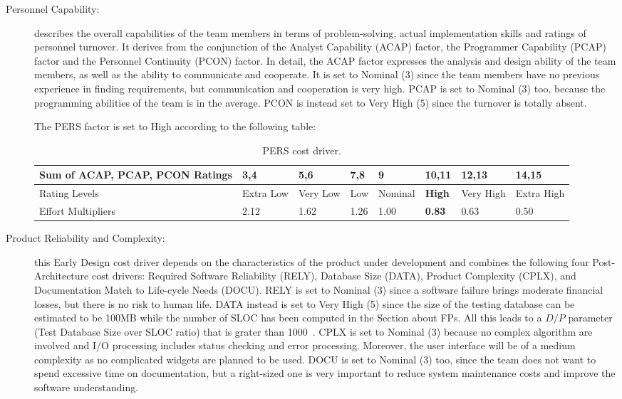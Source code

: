 \begin{description}
\item[Personnel Capability:] describes the overall capabilities of the team members in terms of problem-solving, actual implementation skills and ratings of personnel turnover. It derives from the conjunction of the Analyst Capability (ACAP) factor, the Programmer Capability (PCAP) factor and the Personnel Continuity (PCON) factor. In detail, the ACAP factor expresses the analysis and design ability of the team members, as well as the ability to communicate and cooperate. It is set to Nominal (3) since the team members have no previous experience in finding requirements, but communication and cooperation is very high. PCAP is set to Nominal (3) too, because the programming abilities of the team is in the average. PCON is instead set to Very High (5) since the turnover is totally absent.

The PERS factor is set to High according to the following table:

\begin{table}[H]
	\begin{adjustwidth}{-.5in}{-.5in}
    \centering
    \begin{tabular}{p{4cm}|p{1cm}|p{1cm}|p{1cm}|p{1.5cm}|p{1cm}|p{1cm}|p{1cm}}
        \hline
        Sum of ACAP, PCAP, PCON Ratings & 3,4 & 5,6 & 7,8 & 9 & \textbf{10,11} & 12,13 & 14,15 \\
        \hline
        \hline
        Rating Levels & Extra Low & Very Low & Low & Nominal & \textbf{High} & Very High & Extra High \\
        \hline
        Effort Multipliers & 2.12 & 1.62 & 1.26 & 1.00 & \textbf{0.83} & 0.63 & 0.50 \\
        \hline
    \end{tabular}
    \caption{PERS cost driver.}
    \end{adjustwidth}
\end{table}

\item[Product Reliability and Complexity:] this Early Design cost driver depends on the characteristics of the product under development and combines the following four Post-Architecture cost drivers: Required Software Reliability (RELY), Database Size (DATA), Product Complexity (CPLX), and Documentation Match to Life-cycle Needs (DOCU). RELY is set to Nominal (3) since a software failure brings moderate financial losses, but there is no risk to human life. DATA instead is set to Very High (5) since the size of the testing database can be estimated to be 100MB while the number of SLOC has been computed in the Section about FPs. All this leads to a $D/P$ parameter (Test Database Size over SLOC ratio) that is grater than 1000~\cite{cocomo-guide}. CPLX is set to Nominal (3) because no complex algorithm are involved and I/O processing includes status checking and error processing. Moreover, the user interface will be of a medium complexity as no complicated widgets are planned to be used. DOCU is set to Nominal (3) too, since the team does not want to spend excessive time on documentation, but a right-sized one is very important to reduce system maintenance costs and improve the software understanding.


\end{description}
